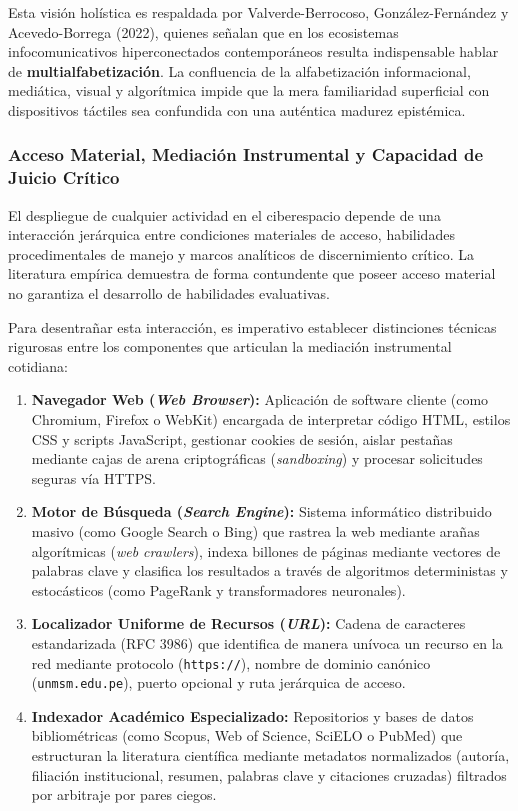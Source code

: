 Esta visión holística es respaldada por Valverde-Berrocoso, González-Fernández y Acevedo-Borrega (2022), quienes señalan que en los ecosistemas infocomunicativos hiperconectados contemporáneos resulta indispensable hablar de \textbf{multialfabetización}. La confluencia de la alfabetización informacional, mediática, visual y algorítmica impide que la mera familiaridad superficial con dispositivos táctiles sea confundida con una auténtica madurez epistémica.

\subsubsection{Acceso Material, Mediación Instrumental y Capacidad de Juicio Crítico}

El despliegue de cualquier actividad en el ciberespacio depende de una interacción jerárquica entre condiciones materiales de acceso, habilidades procedimentales de manejo y marcos analíticos de discernimiento crítico. La literatura empírica demuestra de forma contundente que poseer acceso material no garantiza el desarrollo de habilidades evaluativas. 

Para desentrañar esta interacción, es imperativo establecer distinciones técnicas rigurosas entre los componentes que articulan la mediación instrumental cotidiana:
\begin{enumerate}
    \item \textbf{Navegador Web (\textit{Web Browser}):} Aplicación de software cliente (como Chromium, Firefox o WebKit) encargada de interpretar código HTML, estilos CSS y scripts JavaScript, gestionar cookies de sesión, aislar pestañas mediante cajas de arena criptográficas (\textit{sandboxing}) y procesar solicitudes seguras vía HTTPS.
    \item \textbf{Motor de Búsqueda (\textit{Search Engine}):} Sistema informático distribuido masivo (como Google Search o Bing) que rastrea la web mediante arañas algorítmicas (\textit{web crawlers}), indexa billones de páginas mediante vectores de palabras clave y clasifica los resultados a través de algoritmos deterministas y estocásticos (como PageRank y transformadores neuronales).
    \item \textbf{Localizador Uniforme de Recursos (\textit{URL}):} Cadena de caracteres estandarizada (RFC 3986) que identifica de manera unívoca un recurso en la red mediante protocolo (\texttt{https://}), nombre de dominio canónico (\texttt{unmsm.edu.pe}), puerto opcional y ruta jerárquica de acceso.
    \item \textbf{Indexador Académico Especializado:} Repositorios y bases de datos bibliométricas (como Scopus, Web of Science, SciELO o PubMed) que estructuran la literatura científica mediante metadatos normalizados (autoría, filiación institucional, resumen, palabras clave y citaciones cruzadas) filtrados por arbitraje por pares ciegos.
\end{enumerate}

